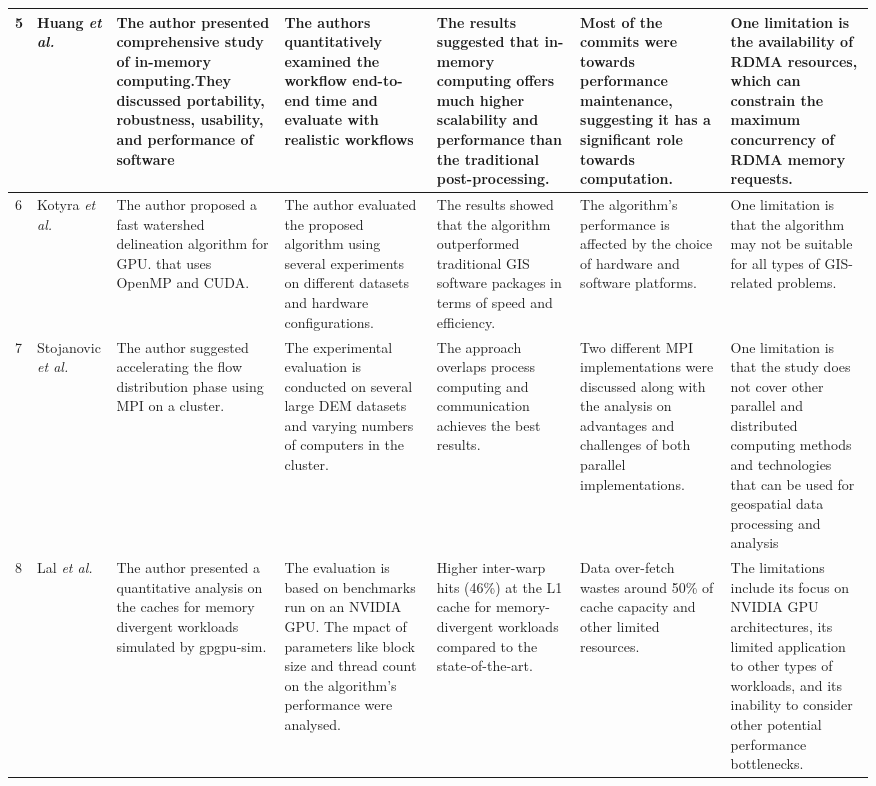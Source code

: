 \documentclass[journal, a4paper]{IEEEtran}
\begin{document}
\begin{table}[]
\begin{tabular}{ | p{0.7cm} | p{1cm} | p{2.5cm} | p{2.5cm} | p{2.5cm} |  p{2.5cm} |p{2.5cm} | }
			5     &  Huang \textit{et al.} \cite{HUANG2022106} & The author presented comprehensive study of in-memory computing.They discussed portability, robustness, usability, and performance of software &  The authors quantitatively examined the workflow end-to-end time and evaluate with realistic workflows & The results suggested that in-memory computing offers much higher scalability and performance than the traditional post-processing. & Most of the commits were towards performance maintenance, suggesting it has a significant role towards computation. & One limitation is the availability of RDMA resources, which can constrain the maximum concurrency of RDMA memory requests.\\
			\hline
			6     &  Kotyra \textit{et al.} \cite{KOTYRA2023105613}& The author proposed a fast watershed delineation algorithm for GPU. that uses OpenMP and CUDA. &  The author evaluated the proposed algorithm using several experiments on different datasets and hardware configurations. &The results showed that the algorithm outperformed traditional GIS software packages in terms of speed and efficiency.  & The algorithm's performance is affected by the choice of hardware and software platforms. & One limitation is that the algorithm may not be suitable for all types of GIS-related problems. \\
			\hline
			7     & 	Stojanovic \textit{et al.} \cite{stojanovic2020accelerating} & The author suggested accelerating the flow distribution phase using MPI on a cluster. &  The experimental evaluation is conducted on several large DEM datasets and varying numbers of computers in the cluster. & The approach overlaps process computing and communication achieves the best results. & Two different MPI implementations were discussed along with the analysis on advantages and challenges of both parallel implementations. &  One limitation is that the study does not cover other parallel and distributed computing methods and technologies that can be used for geospatial data processing and analysis\\
			\hline
			8     &  Lal \textit{et al.} \cite{10.1007/978-3-030-60939-9_16}& The author  presented a quantitative analysis on the caches for memory divergent workloads simulated by gpgpu-sim. & The evaluation is based on benchmarks run on an NVIDIA GPU. The mpact of parameters like block size and thread count on the algorithm's performance  were analysed. & Higher inter-warp hits (46\%) at the L1 cache for memory-divergent workloads compared to the state-of-the-art. & Data over-fetch wastes around 50\% of cache capacity and other limited resources. & The limitations include its focus on NVIDIA GPU architectures, its limited application to other types of workloads, and its inability to consider other potential performance bottlenecks.\\
		\hline
	\end{tabular}
\end{table}
	
\end{document}
